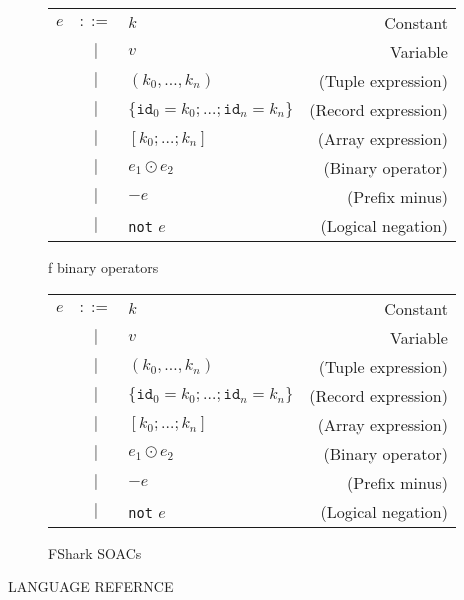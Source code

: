 \begin{figure}
  \centering
  \begin{tabular}{lclr}
    $e$ & $::=$ & $k$ & Constant \\
        & $|$   & $v$ & Variable \\
        & $|$   & $(k_0 , \ldots , k_n)$ & (Tuple expression) \\
        & $|$   & $\{\texttt{id}_0=k_0 ; \ldots ; \texttt{id}_n=k_n\}$ & (Record expression) \\
        & $|$   & $[k_0 ; \ldots ; k_n]$ & (Array expression) \\
        & $|$   & $e_1 \odot e_2$ & (Binary operator) \\
        & $|$   & $-e$ & (Prefix minus) \\
        & $|$   & \texttt{not} $e$ & (Logical negation) \\
  \end{tabular}
  \caption{f binary operators}
\end{figure}

\begin{figure}
  \centering
  \begin{tabular}{lclr}
    $e$ & $::=$ & $k$ & Constant \\
        & $|$   & $v$ & Variable \\
        & $|$   & $(k_0 , \ldots , k_n)$ & (Tuple expression) \\
        & $|$   & $\{\texttt{id}_0=k_0 ; \ldots ; \texttt{id}_n=k_n\}$ & (Record expression) \\
        & $|$   & $[k_0 ; \ldots ; k_n]$ & (Array expression) \\
        & $|$   & $e_1 \odot e_2$ & (Binary operator) \\
        & $|$   & $-e$ & (Prefix minus) \\
        & $|$   & \texttt{not} $e$ & (Logical negation) \\
  \end{tabular}
  \caption{FShark SOACs}
\end{figure}

LANGUAGE REFERNCE